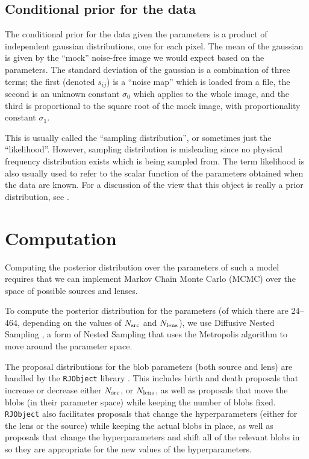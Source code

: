 \documentclass[useAMS,usenatbib]{mn2e}
\begin{document}
\subsection{Conditional prior for the data}
The conditional prior for the data given the parameters
is a product of independent gaussian distributions, one for each pixel.
The mean of the gaussian is given by the ``mock'' noise-free image we would
expect based on the parameters. The standard deviation of the gaussian is
a combination of three terms; the first (denoted $s_{ij}$) is a ``noise map''
which is loaded from a file, the second is an unknown constant $\sigma_0$
which applies to the whole image, and the third is proportional to the
square root of the mock image, with proportionality constant $\sigma_1$.

This is usually called the ``sampling distribution'', or sometimes just the
``likelihood''. However, sampling distribution is misleading since no
physical frequency distribution exists which is being sampled from. The term
likelihood is also usually used to refer to the scalar function of the parameters
obtained when the data are known. For a discussion of the view that this
object is really a prior distribution, see \citet[][pp. 33--35]{caticha}.

\section{Computation}
Computing the posterior distribution over the parameters of such a model
requires that we can implement Markov Chain Monte Carlo (MCMC) over the space
of possible sources and lenses.

To compute the posterior distribution for the parameters
(of which there are 24--464, depending on the values of $N_{\rm src}$ and
$N_{\rm lens}$), we use Diffusive Nested Sampling \citep{dnest}, a form
of Nested Sampling \citep{skilling} that uses the Metropolis algorithm
to move around the parameter space.

The proposal distributions for the blob parameters (both source and lens) are
handled by the {\tt RJObject} library \citep{rjobject}. This includes
birth and death proposals that increase or decrease either $N_{\rm src}$,
or $N_{\rm lens}$, as well as proposals that move the blobs (in their parameter
space) while keeping the number of blobs fixed. {\tt RJObject} also
facilitates proposals that change the hyperparameters (either for the lens
or the source) while keeping the actual blobs in place, as well as proposals
that change the hyperparameters and shift all of the relevant blobs in
so they are appropriate for the new values of the hyperparameters.
\end{document}
